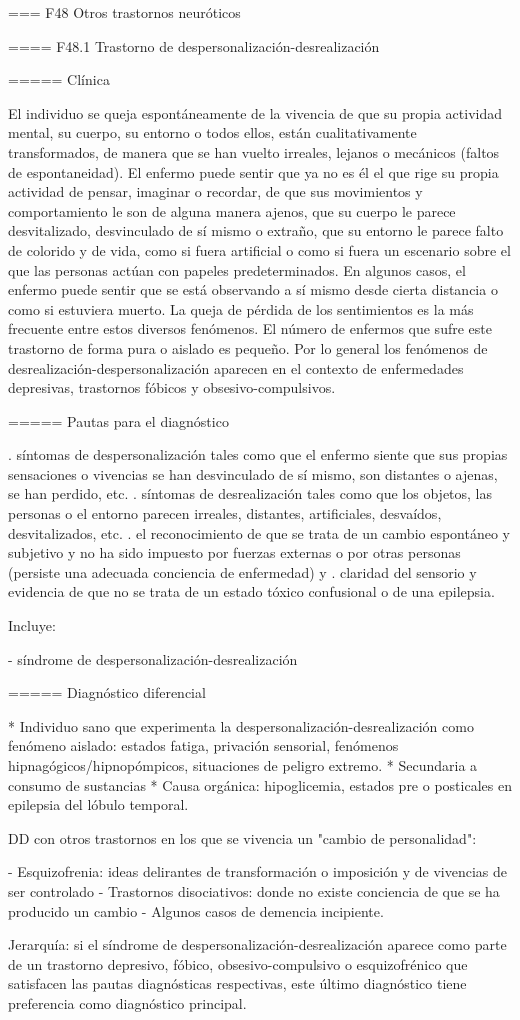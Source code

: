 \documentclass[encares.tex]{subfiles}
\begin{document}
=== F48 Otros trastornos neuróticos

==== F48.1 Trastorno de despersonalización-desrealización

===== Clínica

El individuo se queja espontáneamente de la vivencia de que su propia actividad mental, su cuerpo, su entorno o todos ellos, están cualitativamente transformados, de manera que se han vuelto irreales, lejanos o mecánicos (faltos de espontaneidad). El enfermo puede sentir que ya no es él el que rige su propia actividad de pensar, imaginar o recordar, de que sus movimientos y comportamiento le son de alguna manera ajenos, que su cuerpo le parece desvitalizado, desvinculado de sí mismo o extraño, que su entorno le parece falto de colorido y de vida, como si fuera artificial o como si fuera un escenario sobre el que las personas actúan con papeles predeterminados. En algunos casos, el enfermo puede sentir que se está observando a sí mismo desde cierta distancia o como si estuviera muerto. La queja de pérdida de los sentimientos es la más frecuente entre estos diversos fenómenos. El número de enfermos que sufre este trastorno de forma pura o aislado es pequeño. Por lo general los fenómenos de desrealización-despersonalización aparecen en el contexto de enfermedades depresivas, trastornos fóbicos y obsesivo-compulsivos. 

===== Pautas para el diagnóstico

. síntomas de despersonalización tales como que el enfermo siente que sus propias sensaciones o vivencias se han desvinculado de sí mismo, son distantes o ajenas, se han perdido, etc.
. síntomas de desrealización tales como que los objetos, las personas o el entorno parecen irreales, distantes, artificiales, desvaídos, desvitalizados, etc.
. el reconocimiento de que se trata de un cambio espontáneo y subjetivo y no ha sido impuesto por fuerzas externas o por otras personas (persiste una adecuada conciencia de enfermedad) y
. claridad del sensorio y evidencia de que no se trata de un estado tóxico confusional o de una epilepsia.

Incluye:

- síndrome de despersonalización-desrealización

===== Diagnóstico diferencial

* Individuo sano que experimenta la despersonalización-desrealización como fenómeno aislado: estados fatiga, privación sensorial, fenómenos hipnagógicos/hipnopómpicos, situaciones de peligro extremo.
* Secundaria a consumo de sustancias
* Causa orgánica: hipoglicemia, estados pre o posticales en epilepsia del lóbulo temporal.

DD con otros trastornos en los que se vivencia un "cambio de personalidad":

- Esquizofrenia: ideas delirantes de transformación o imposición y de vivencias de ser controlado
- Trastornos disociativos: donde no existe conciencia de que se ha producido un cambio
- Algunos casos de demencia incipiente. 


Jerarquía: si el síndrome de despersonalización-desrealización aparece como parte de un trastorno depresivo, fóbico, obsesivo-compulsivo o esquizofrénico que satisfacen las pautas diagnósticas respectivas, este último diagnóstico tiene preferencia como diagnóstico principal.
\end{document}
